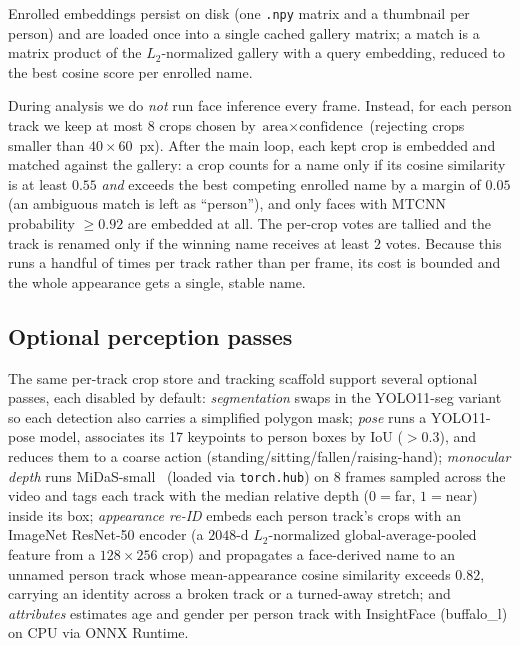 \documentclass[conference]{IEEEtran}
\begin{document}
Enrolled embeddings persist on disk (one \texttt{.npy} matrix and a
thumbnail per person) and are loaded once into a single cached gallery
matrix; a match is a matrix product of the $L_2$-normalized gallery with
a query embedding, reduced to the best cosine score per enrolled name.

During analysis we do \emph{not} run face inference every frame. Instead,
for each person track we keep at most $8$ crops chosen by
$\text{area}\times\text{confidence}$ (rejecting crops smaller than
$40\times60$~px). After the main loop, each kept crop is embedded and
matched against the gallery: a crop counts for a name only if its cosine
similarity is at least $0.55$ \emph{and} exceeds the best competing
enrolled name by a margin of $0.05$ (an ambiguous match is left as
``person''), and only faces with MTCNN probability $\ge 0.92$ are
embedded at all. The per-crop votes are tallied and the track is renamed
only if the winning name receives at least $2$ votes. Because this runs a
handful of times per track rather than per frame, its cost is bounded and
the whole appearance gets a single, stable name.

\subsection{Optional perception passes}
The same per-track crop store and tracking scaffold support several
optional passes, each disabled by default:
\emph{segmentation} swaps in the YOLO11-seg variant so each detection
also carries a simplified polygon mask;
\emph{pose} runs a YOLO11-pose model, associates its 17 keypoints to
person boxes by IoU ($>0.3$), and reduces them to a coarse action
(standing/sitting/fallen/raising-hand);
\emph{monocular depth} runs MiDaS-small~\cite{midas} (loaded via
\texttt{torch.hub}) on $8$ frames sampled across the video and tags each
track with the median relative depth ($0=$far, $1=$near) inside its box;
\emph{appearance re-ID} embeds each person track's crops with an ImageNet
ResNet-50 encoder (a $2048$-d $L_2$-normalized global-average-pooled
feature from a $128\times256$ crop) and propagates a face-derived name to
an unnamed person track whose mean-appearance cosine similarity exceeds
$0.82$, carrying an identity across a broken track or a turned-away
stretch; and \emph{attributes} estimates age and gender per person track
with InsightFace (buffalo\_l) on CPU via ONNX Runtime.
\end{document}
